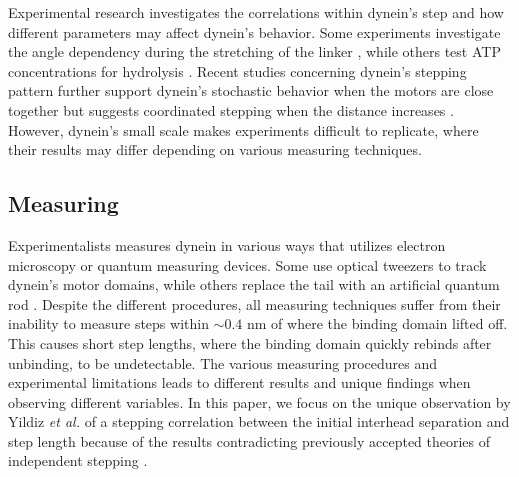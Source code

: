 Experimental research investigates the correlations within dynein's step and how different parameters may affect dynein's behavior. Some experiments investigate the angle dependency during the stretching of the linker \cite{can2019directionality}, while others test ATP concentrations for hydrolysis \cite{manna2020mechanistic, elshenawy2020lis1}. Recent studies concerning dynein's stepping pattern further support dynein's stochastic behavior when the motors are close together but suggests coordinated stepping when the distance increases \cite{qiu2012dynein, Dewitt2012}. However, dynein's small scale makes experiments difficult to replicate, where their results may differ depending on various measuring techniques. 


\subsection{Measuring}

Experimentalists measures dynein in various ways that utilizes electron microscopy or quantum measuring devices. Some use optical tweezers to track dynein's motor domains, while others replace the tail with an artificial quantum rod \cite{kinoshita2018step, Dewitt2012}. Despite the different procedures, all measuring techniques suffer from their inability to measure steps within $\sim 0.4$ nm of where the binding domain lifted off. This causes short step lengths, where the binding domain quickly rebinds after unbinding, to be undetectable. The various measuring procedures and experimental limitations leads to different results and unique findings when observing different variables. In this paper, we focus on the unique observation by Yildiz \textit{et al.} of a stepping correlation between the initial interhead separation and step length because of the results contradicting previously accepted theories of independent stepping \cite{Dewitt2012}. 


